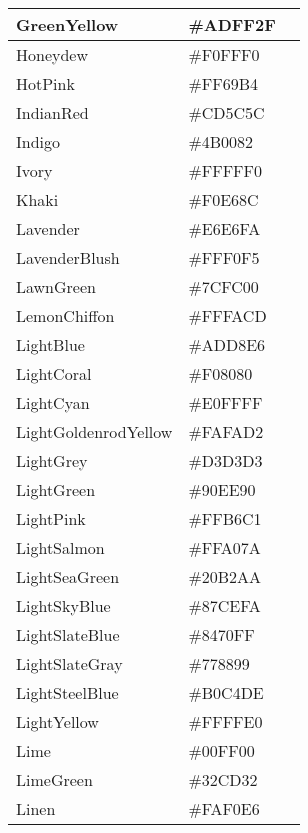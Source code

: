 \begin{longtable}{|p{100pt}|p{100pt}|p{100pt}|}
\hline
GreenYellow	&\#ADFF2F	 &\cellcolor{GreenYellow}\\
\hline
Honeydew	&\#F0FFF0	 &\cellcolor{Honeydew}\\
\hline
HotPink		&\#FF69B4	 &\cellcolor{HotPink}\\
\hline
IndianRed		&\#CD5C5C&\cellcolor{IndianRed}	 \\
\hline
Indigo		&\#4B0082&\cellcolor{Indigo}	 	\\
\hline
Ivory		&\#FFFFF0	 &\cellcolor{Ivory}\\
\hline
Khaki		&\#F0E68C	 &\cellcolor{Khaki}\\
\hline
Lavender		&\#E6E6FA	 &\cellcolor{Lavender}\\
\hline
LavenderBlush&\#FFF0F5	 &\cellcolor{LavenderBlush}\\
\hline
LawnGreen	&\#7CFC00	 &\cellcolor{LawnGreen}\\
\hline
LemonChiffon	&\#FFFACD	 &\cellcolor{LemonChiffon}\\
\hline
LightBlue		&\#ADD8E6	 &\cellcolor{LightBlue}\\
\hline
LightCoral	&\#F08080	 &\cellcolor{LightCoral}\\
\hline
LightCyan	&\#E0FFFF	 &\cellcolor{LightCyan}\\
\hline
LightGoldenrodYellow&\#FAFAD2	 &\cellcolor{LightGoldenrodYellow}\\
\hline
LightGrey	&\#D3D3D3	 &\cellcolor{LightGrey}\\
\hline
LightGreen	&\#90EE90	 &\cellcolor{LightGreen}\\
\hline
LightPink		&\#FFB6C1	 &\cellcolor{LightPink}\\
\hline
LightSalmon	&\#FFA07A	 &\cellcolor{LightSalmon}	\\
\hline
LightSeaGreen&\#20B2AA	 &\cellcolor{LightSeaGreen}\\
\hline
LightSkyBlue	&\#87CEFA	 &\cellcolor{LightSkyBlue}\\
\hline
LightSlateBlue&\#8470FF	 &\cellcolor{LightSlateBlue}\\
\hline
LightSlateGray&\#778899&\cellcolor{LightSlateGray}	 \\
\hline
LightSteelBlue&\#B0C4DE&\cellcolor{LightSteelBlue}	 \\
\hline
LightYellow	&\#FFFFE0	 &\cellcolor{LightYellow}\\
\hline
Lime			&\#00FF00	 &\cellcolor{Lime}\\
\hline
LimeGreen	&\#32CD32	 &\cellcolor{LimeGreen}\\
\hline
Linen		&\#FAF0E6	 &\cellcolor{Linen}\\

\end{longtable}
